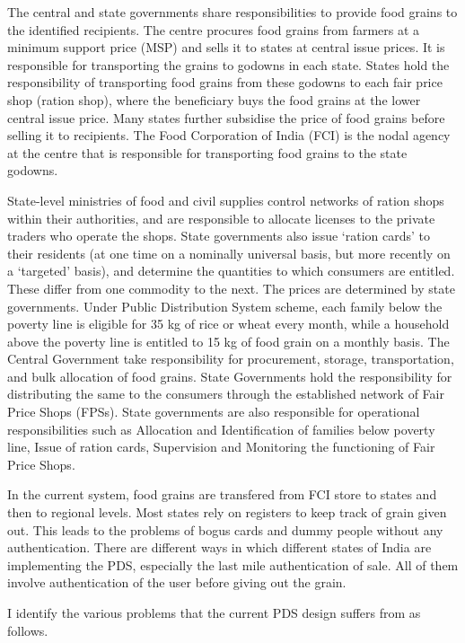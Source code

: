 \documentclass{article}
\begin{document}
The central and state governments share responsibilities to provide food grains to the identified recipients. The centre procures food grains from farmers at a minimum support price (MSP) and sells it to states at central issue prices. It is responsible for transporting the grains to godowns in each state. States hold the responsibility of transporting food grains from these godowns to each fair price shop (ration shop), where the beneficiary buys the food grains at the lower central issue price. Many states further subsidise the price of food grains before selling it to recipients. The Food Corporation of India (FCI) is the nodal agency at the centre that is responsible for transporting food grains to the state godowns.\par
State-level ministries of food and civil supplies control networks of ration shops within their authorities, and are responsible to allocate licenses to the private traders who operate the shops. State governments also issue ‘ration cards’ to their residents (at one time on a nominally universal basis, but more recently on a ‘targeted’ basis), and determine the quantities to which consumers are entitled. These differ from one commodity to the next. The prices are determined by state governments. Under Public Distribution System scheme, each family below the poverty line is eligible for 35 kg of rice or wheat every month, while a household above the poverty line is entitled to 15 kg of food grain on a monthly basis. The Central Government take responsibility for procurement, storage, transportation, and bulk allocation of food grains. State Governments hold the responsibility for distributing the same to the consumers through the established network of Fair Price Shops (FPSs). State governments are also responsible for operational responsibilities such as Allocation and Identification of families below poverty line, Issue of ration cards, Supervision and Monitoring the functioning of Fair Price Shops.\par
In the current system, food grains are transfered from FCI store to states and then to regional levels. Most states rely on registers to keep track of grain given out. This leads to the problems of bogus cards and dummy people without any authentication. There are different ways in which different states of India are implementing the PDS, especially the last mile authentication of sale. All of them involve authentication of the user before giving out the grain. 
\par I identify the various problems that the current PDS design suffers from as follows.
\end{document}
